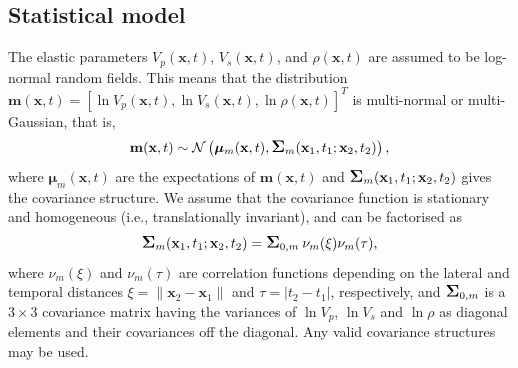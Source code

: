 \documentclass[screen,citenumeric,long,10pt]{nrdoc_060418}
\newcommand{\vect}[1]{\ensuremath{\mathbf{#1}}}
\newcommand{\bmu}{\bm\mu}
\newcommand{\bSigma}{\mbox{\large\ensuremath{\boldsymbol{\Sigma}}}}
\newcommand{\vp}{\ensuremath{V_p}\xspace}      %
\newcommand{\vs}{\ensuremath{V_s}\xspace}      %
\newcommand{\cml}{\nu_m}
\newcommand{\cmt}{\nu_m}
\begin{document}
\begin{multicols}{2}
\section{Statistical model}

The elastic parameters $\vp(\vect{x},t)$, $\vs(\vect{x},t)$, and
$\rho(\vect{x},t)$ are assumed to be log-normal random
fields. This means that the distribution $\vect{m}(\vect{x},t) = 
\left[\ln\vp(\vect{x},t),\ln\vs(\vect{x},t),\ln\rho(\vect{x},t)\right]^T$
is multi-normal or multi-Gaussian, that is,
%
\begin{equation}  
  \vect{m}(\vect{x},t) \sim 
  \mathcal{N}\left(\bmu_m(\vect{x},t),\bSigma_m(\vect{x}_1,t_1;\vect{x}_2,t_2)\right),
\label{mdist}
\end{equation}
%
where $\bmu_m(\vect{x},t)$ are the expectations of
$\vect{m}(\vect{x},t)$ and $\bSigma_m(\vect{x}_1,t_1;\vect{x}_2,t_2)$
gives the covariance structure. We assume that the covariance function
is stationary and homogeneous (i.e., translationally invariant), and
can be factorised as   
%
\begin{equation}
  \bSigma_m(\vect{x}_1,t_1;\vect{x}_2,t_2)
    = \bSigma_{0,m} \: \cml(\xi) \cmt(\tau), \label{sigma_m}
\end{equation} 
where $\cml(\xi)$ and $\cmt(\tau)$ are correlation functions
depending on the lateral and temporal distances 
$\xi = \|\vect{x}_2 - \vect{x}_1\|$ and $\tau=|t_2-t_1|$,
respectively, and $\bSigma_{0,m}$ is a $3\times 3$ covariance matrix
having the variances of $\ln\vp$, $\ln\vs$ and $\ln\rho$  as diagonal
elements and their covariances off the diagonal. Any valid covariance
structures may be used. 


\end{multicols}
\end{document}
